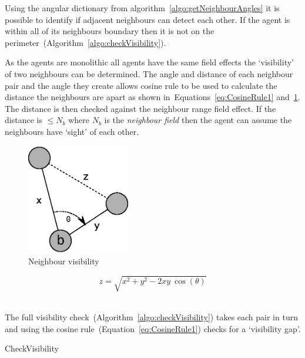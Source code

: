 Using the angular dictionary from algorithm~\ref{algo:getNeighbourAngles} it is possible to identify if adjacent neighbours can detect each other. If the agent is within all of its neighbours boundary then it is not on the perimeter~(Algorithm~\ref{algo:checkVisibility}). 

As the agents are monolithic all agents have the same field effects the `visibility' of two neighbours can be determined. The angle and distance of each neighbour pair and the angle they create allows cosine rule to be used to calculate the distance the neighbours are apart as shown in~Equations~\ref{eq:CosineRule1} and~\ref{reduced:Triangulate}. The distance is then checked against the neighbour range field effect. If the distance is $\leq N_b$ where $N_b$ is the \textit{neighbour field} then the agent can assume the neighbours have `sight' of each other. 

\begin{figure}[H]
\begin{center}
\includegraphics[width=4.5cm]{CHAPTER-6/figures/Triangulate}
\end{center}
\caption{Neighbour visibility\label{reduced:Triangulate}}
\end{figure}

\begin{equation}\label{eq:CosineRule1}
z = \sqrt{x^2 + y^2 - 2xy~\cos(\theta)}
\end{equation}‎

The full visibility check~(Algorithm~\ref{algo:checkVisibility}) takes each pair in turn and using the cosine rule~(Equation~\ref{eq:CosineRule1}) checks for a `visibility gap'. 

\begin{algorithm}[H]
\DontPrintSemicolon
\SetAlgoLined
\caption{CheckVisibility}
\label{algo:checkVisibility}
\end{algorithm}

